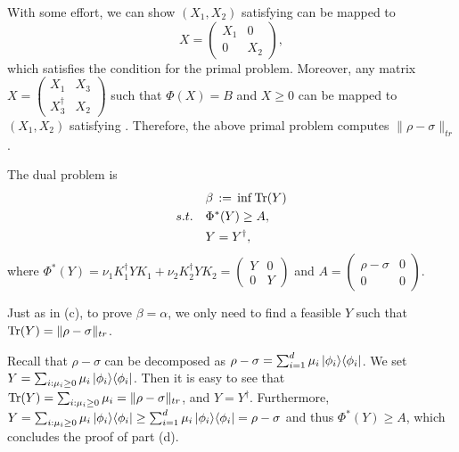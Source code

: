 \documentclass[12pt]{article}
\begin{document}
\begin{enumerate}
\begin{enumerate}
With some effort, we can show $(X_1, X_2)$ satisfying  can be mapped to
\[
  X = \begin{pmatrix} X_1 & 0 \\ 0 & X_2 \end{pmatrix},
\] 
which satisfies the condition for the primal problem. Moreover, any matrix $X = \begin{pmatrix} X_1 & X_3 \\ X_3^\dagger & X_2 \end{pmatrix}$ such that $\Phi(X)=B$ and $X \geq 0$ can be mapped to $(X_1, X_2)$ satisfying . Therefore, the above primal problem computes $\|\rho - \sigma\|_{tr}$.

The dual problem is
\begin{align}
&\beta\,:=\,  \inf \mathrm{Tr}(Y) \notag\\
s.t.\quad&  \Phi^*(Y)\geq A,\notag\\
\qquad &Y=Y^\dagger,\notag
\end{align}
where $\Phi^*(Y) = \nu_1 K_1^\dagger Y K_1 + \nu_2 K_2^\dagger Y K_2 = \begin{pmatrix} Y & 0 \\ 0 & Y \end{pmatrix}$ and $A = \begin{pmatrix} \rho - \sigma & 0 \\ 0 & 0 \end{pmatrix}$.

Just as in (c), to prove $\beta = \alpha$, we only need to find a feasible $Y$ such that $\mathrm{Tr}(Y) = \|\rho - \sigma\|_{tr}$.

Recall that $\rho - \sigma$ can be decomposed as $\rho - \sigma = \sum_{i = 1}^d \mu_i \ket{\phi_i}\!\bra{\phi_i}$. We set $Y = \sum_{i: \mu_i \ge 0}\mu_i \ket{\phi_i}\!\bra{\phi_i}$. Then it is easy to see that $\mathrm{Tr}(Y) = \sum_{i: \mu_i \ge 0}\mu_i =  \|\rho - \sigma\|_{tr}$, and $Y = Y^\dagger$. Furthermore, $Y = \sum_{i: \mu_i \ge 0}\mu_i \ket{\phi_i}\!\bra{\phi_i} \geq \sum_{i = 1}^d \mu_i \ket{\phi_i}\!\bra{\phi_i} = \rho - \sigma$ and thus $\Phi^*(Y)\geq A$, which concludes the proof of part (d).
\end{enumerate}
\end{enumerate}
\end{document}
